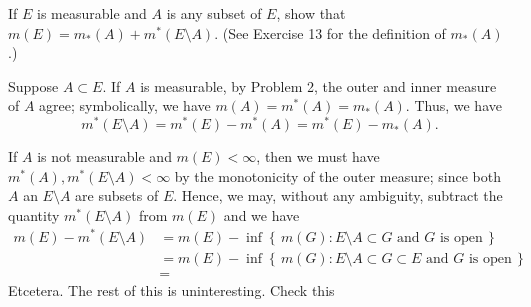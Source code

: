 \begin{problem}
  If $E$ is measurable and $A$ is any subset of $E$, show that
  $m(E)=m_*(A)+m^*(E\setminus A)$. (See Exercise 13 for the definition
  of $m_*(A)$.)
\end{problem}
\begin{solution}
  Suppose $A\subset E$. If $A$ is measurable, by Problem 2, the outer and
  inner measure of $A$ agree; symbolically, we have
  $m(A)=m^*(A)=m_*(A)$. Thus, we have
  \[
    m^*(E\setminus A)=m^*(E)-m^*(A)=m^*(E)-m_*(A).
  \]

  If $A$ is not measurable and $m(E)<\infty$, then
  we must have $m^*(A),m^*(E\setminus A)<\infty$ by the monotonicity
  of the outer measure; since both $A$ an $E\setminus A$ are subsets
  of $E$. Hence, we may, without any ambiguity, subtract the quantity
  $m^*(E\setminus A)$ from $m(E)$ and we have
  \begin{align*}
    m(E)-m^*(E\setminus A)
    &=m(E)
      -\inf\left\{\,m(G):\text{$E\setminus A\subset G$ and $G$ is
      open}\,\right\}\\
    &=m(E)
      -\inf\left\{\,m(G):\text{$E\setminus A\subset G\subset E$ and $G$ is
      open}\,\right\}\\
    &=
  \end{align*}
  Etcetera. The rest of this is uninteresting. Check this
\end{solution}

